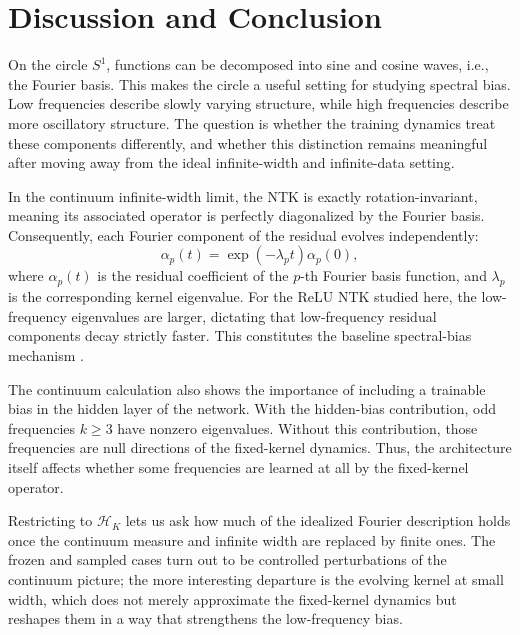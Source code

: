 \chapter{Discussion and Conclusion}
\label{cha:discussion-conclusion}

On the circle $S^1$, functions can be decomposed into sine and cosine waves,
i.e., the Fourier basis. This makes the circle a useful setting for studying
spectral bias. Low frequencies describe slowly varying structure, while high
frequencies describe more oscillatory structure. The question is whether the
training dynamics treat these components differently, and whether this
distinction remains meaningful after moving away from the ideal infinite-width
and infinite-data setting.

In the continuum infinite-width limit, the NTK is exactly rotation-invariant,
meaning its associated operator is perfectly diagonalized by the Fourier basis.
Consequently, each Fourier component of the residual evolves independently:
\begin{equation}
	\alpha_p(t)
	=
	\exp(-\lambda_p t)\alpha_p(0),
	\label{eq:discussion-continuum-mode-decay}
\end{equation}
where $\alpha_p(t)$ is the residual coefficient of the $p$-th Fourier basis
function, and $\lambda_p$ is the corresponding kernel eigenvalue. For the ReLU
NTK studied here, the low-frequency eigenvalues are larger, dictating that
low-frequency residual components decay strictly faster. This constitutes the
baseline spectral-bias mechanism
\citep{jacot2018ntk,lee2020wide,rahaman2019spectralbiasneuralnetworks,
	basri2019convergence,bietti2019inductivebiasneuraltangent,
	cao2020understandingspectralbiasdeep}.

The continuum calculation also shows the importance of including a trainable
bias in the hidden layer of the network. With the hidden-bias contribution, odd frequencies
$k\ge 3$ have nonzero eigenvalues. Without this contribution, those frequencies
are null directions of the fixed-kernel dynamics. Thus, the architecture itself
affects whether some frequencies are learned at all by the fixed-kernel
operator.

Restricting to \(\mathcal H_K\) lets us ask how much of the idealized Fourier
description holds once the continuum measure and infinite width are replaced by
finite ones. The frozen and sampled cases turn out to be controlled perturbations
of the continuum picture; the more interesting departure is the evolving kernel at
small width, which does not merely approximate the fixed-kernel dynamics but
reshapes them in a way that strengthens the low-frequency bias.

